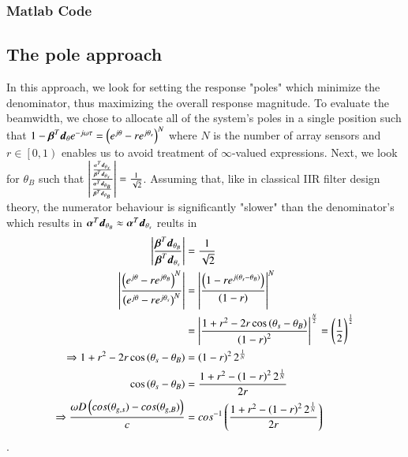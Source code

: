 \subsubsection*{Matlab Code}

\subsection{The pole approach}
In this approach, we look for setting the response "poles" which minimize the denominator, thus maximizing the overall response magnitude. To evaluate the beamwidth, we chose to allocate all of the system's poles in a single position such that 
$
1-\boldsymbol{\beta}^{T}\boldsymbol{d}_{\theta}e^{-j\omega\tau}
=
\left(e^{j\theta}-re^{j\theta_{s}}\right)^{N}
$
where $N$ is the number of array sensors and $r \in \left[0,1\right)$ enables us to avoid treatment of $\infty$-valued expressions. Next, we look for $\theta_{B}$ such that
$
\left|\frac{
\frac
{
\boldsymbol{\alpha}^{T}\boldsymbol{d}_{\theta_{s}}
}{
\boldsymbol{\beta}^{T}\boldsymbol{d}_{\theta_{s}}
}
}{
\frac
{
\boldsymbol{\alpha}^{T}\boldsymbol{d}_{\theta_{B}}
}{
\boldsymbol{\beta}^{T}\boldsymbol{d}_{\theta_{B}}
}
}\right|
= \frac{1}{\sqrt{2}}
$. Assuming that, like in classical IIR filter design theory, the numerator behaviour is significantly "slower" than the denominator's which results in $\boldsymbol{\alpha}^{T}\boldsymbol{d}_{\theta_{B}} 
\approx
\boldsymbol{\alpha}^{T}\boldsymbol{d}_{\theta_{s}}$ reults in
\begin{align*}
    \left|\frac{
    \boldsymbol{\beta}^{T}\boldsymbol{d}_{\theta_{B}}
    }{
    \boldsymbol{\beta}^{T}\boldsymbol{d}_{\theta_{s}}
    }\right|
    &= \frac{1}{\sqrt{2}}
    \\
    \left|
    \frac{
    \left(e^{j\theta}-re^{j\theta_{B}}\right)^{N}
    }{
    \left(e^{j\theta}-re^{j\theta_{s}}\right)^{N}
    }
    \right|
    &=
    \left|
    \frac{
    \left(1-re^{j\left(\theta_{s}-\theta_{B}\right)}\right)
    }{
    \left(1-r\right)
    }
    \right|^{N}
    \\
    &=
    \left|
    \frac{
    1+r^{2}-2r\cos{\left(\theta_{s}-\theta_{B}\right)}
    }{
    \left(1-r\right)^{2}
    }
    \right|^{\frac{N}{2}}
    =
    \left(\frac{1}{2}\right)^{\frac{1}{2}}
    \\
    \Rightarrow 
    1+r^{2}-2r\cos{\left(\theta_{s}-\theta_{B}\right)}
    &=
    \left(1-r\right)^{2}2^{\frac{1}{N}}
    \\
    \cos{\left(\theta_{s}-\theta_{B}\right)}
    &=
    \frac{
    1+r^{2}-\left(1-r\right)^{2}2^{\frac{1}{N}}
    }{
    2r
    }
    \\
    \Rightarrow
    \frac{\omega{D\left(cos(\theta_{g,s})-cos(\theta_{g,B})\right)}}{c}
    &=
    cos^{-1}
    \left(
    \frac{1+r^{2}-\left(1-r\right)^{2}2^{\frac{1}{N}}}{2r}
    \right)
\end{align*}.
